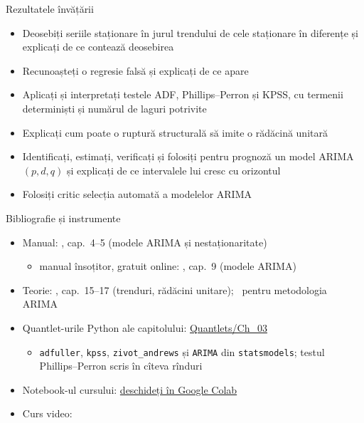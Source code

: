 \begin{frame}{Rezultatele învățării}
\itemsize{\small}
\begin{itemize}
    \item Deosebiți seriile staționare în jurul trendului de cele staționare în diferențe și explicați de ce contează deosebirea
    \item Recunoașteți o regresie falsă și explicați de ce apare
    \item Aplicați și interpretați testele ADF, Phillips--Perron și KPSS, cu termenii determiniști și numărul de laguri potrivite
    \item Explicați cum poate o ruptură structurală să imite o rădăcină unitară
    \item Identificați, estimați, verificați și folosiți pentru prognoză un model ARIMA$(p,d,q)$ și explicați de ce intervalele lui cresc cu orizontul
    \item Folosiți critic selecția automată a modelelor ARIMA
\end{itemize}
\end{frame}

\begin{frame}{Bibliografie și instrumente}
\itemsize{\small}
\begin{itemize}
    \item Manual: , cap.~4--5 (modele ARIMA și nestaționaritate)
    \begin{itemize}
        \item manual însoțitor, gratuit online: , cap.~9 (modele ARIMA)
    \end{itemize}
    \item Teorie: , cap.~15--17 (trenduri, rădăcini unitare); \ pentru metodologia ARIMA
    \item Quantlet-urile Python ale capitolului: \href{https://github.com/danpele/Time-Series-Analysis/tree/main/Quantlets/Ch_03}{Quantlets/Ch\_03}
    \begin{itemize}
        \item \texttt{adfuller}, \texttt{kpss}, \texttt{zivot\_andrews} și \texttt{ARIMA} din \texttt{statsmodels}; testul Phillips--Perron scris în cîteva rînduri
    \end{itemize}
    \item Notebook-ul cursului: \href{\colaburl{notebooks/EN/chapter3_lecture_notebook.ipynb}}{deschideți în Google Colab}
    \item Curs video: 
\end{itemize}
\end{frame}


